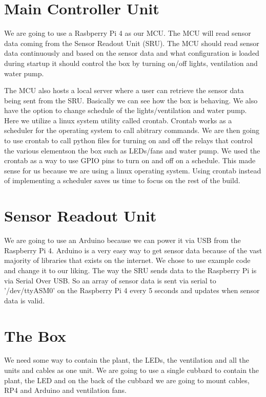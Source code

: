 \documentclass[a4paper,12pt,twoside,openright,titlepage]{book}
\begin{document}
\section{Main Controller Unit}

We are going to use a Rasbperry Pi 4 as our MCU. 
The MCU will read sensor data coming from the Sensor Readout Unit (SRU).
The MCU should read sensor data continuously and based on the sensor data and what configuration is loaded during startup it should control the box by turning on/off lights, ventilation and water pump.

The MCU also hosts a local server where a user can retrieve the sensor data being sent from the SRU. Basically we can see how the box is behaving.
We also have the option to change schedule of the lights/ventilation and water pump. Here we utilize a linux system utility called crontab. \cite{crontab}
Crontab works as a scheduler for the operating system to call abitrary commands. We are then going to use crontab to call python files for turning on and off the relays that control the various elementson the box such as LEDs/fans and water pump.
We used the crontab as a way to use GPIO pins to turn on and off on a schedule. This made sense for us because we are using a linux operating system. Using crontab instead of implementing a scheduler saves us time to focus on the rest of the build.

\section{Sensor Readout Unit}

We are going to use an Arduino because we can power it via USB from the Raspberry Pi 4.
Arduino is a very easy way to get sensor data because of the vast majority of libraries that exists on the internet. We chose to use example code and change it to our liking. The way the SRU sends data to the Raspberry Pi is via Serial Over USB. So an array of sensor data is sent via serial to '/dev/ttyASM0' on the Raspberry Pi 4 every 5 seconds and updates when sensor data is valid.

\section{The Box}

We need some way to contain the plant, the LEDs, the ventilation and all the units and cables as one unit. We are going to use a single cubbard to contain the plant, the LED and on the back of the cubbard we are going to mount cables, RP4 and Arduino and ventilation fans.
\end{document}
